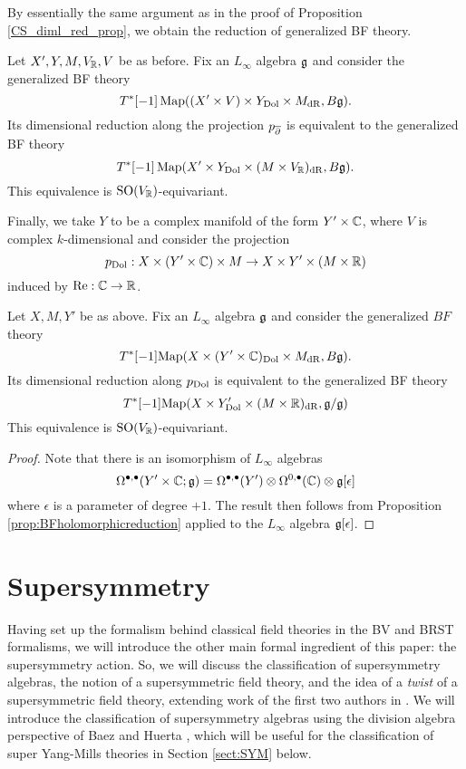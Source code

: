\documentclass[10pt, oneside]{article}
\begin{document}
By essentially the same argument as in the proof of Proposition \ref{CS_diml_red_prop}, we obtain the reduction of generalized BF theory. 

\begin{prop}
Let $X', Y, M, V_\mathbb R, V$ be as before. 
Fix an $L_\infty$ algebra $\mathfrak g$ and consider the generalized BF theory
\[T^*[-1] \operatorname{Map}((X'\times V)\times Y_{\mathrm{Dol}}\times M_{\mathrm{dR}}, B\mathfrak g).\]
Its dimensional reduction along the projection $p_{\overline{\partial}}$ is equivalent to the generalized BF theory
\[T^*[-1] \operatorname{Map}(X'\times Y_{\mathrm{Dol}}\times (M\times V_\mathbb R)_{\mathrm{dR}}, B\mathfrak g).\]
This equivalence is $\mathrm{SO}(V_\mathbb R)$-equivariant.
\label{prop:BFholomorphicreduction}
\end{prop}

Finally, we take $Y$ to be a complex manifold of the form $Y' \times \mathbb C$, where $V$ is complex $k$-dimensional and consider the projection
\[
p_{\rm Dol} : X \times (Y' \times \mathbb C) \times M \to X \times Y' \times (M \times \mathbb R) 
\]
induced by ${\rm Re} : \mathbb C \to \mathbb R$.

\begin{prop}
\label{prop:BFdolbeaultreduction}
Let $X, M, Y'$ be as above.
Fix an $L_\infty$ algebra $\mathfrak g$ and consider the generalized $BF$ theory
\[
T^*[-1] {\rm Map}(X \times (Y' \times \mathbb C)_{\rm Dol} \times M_{\rm dR} , B \mathfrak g) .
\]
Its dimensional reduction along $p_{\rm Dol}$ is equivalent to the generalized BF theory
\[
T^*[-1] {\rm Map} (X \times Y'_{\rm Dol} \times (M \times \mathbb R)_{\rm dR}, \mathfrak g / \mathfrak g)
\]
This equivalence is $\mathrm{SO}(V_\mathbb R)$-equivariant.
\end{prop}
\begin{proof}
Note that there is an isomorphism of $L_\infty$ algebras
\[
\Omega^{\bullet, \bullet} (Y' \times \mathbb C ; \mathfrak g) = \Omega^{\bullet,\bullet}(Y') \otimes \Omega^{0,\bullet}(\mathbb C) \otimes \mathfrak g[\epsilon]
\]
where $\epsilon$ is a parameter of degree $+1$.
The result then follows from Proposition \ref{prop:BFholomorphicreduction} applied to the $L_\infty$ algebra $\mathfrak g[\epsilon]$. 
\end{proof}

\section{Supersymmetry} \label{sect:susy}
Having set up the formalism behind classical field theories in the BV and BRST formalisms, we will introduce the other main formal ingredient of this paper: the supersymmetry action.  So, we will discuss the classification of supersymmetry algebras, the notion of a supersymmetric field theory, and the idea of a \emph{twist} of a supersymmetric field theory, extending work of the first two authors in \cite{ElliottSafronov}.  We will introduce the classification of supersymmetry algebras using the division algebra perspective of Baez and Huerta \cite{BaezHuerta}, which will be useful for the classification of super Yang-Mills theories in Section \ref{sect:SYM} below.
\end{document}
